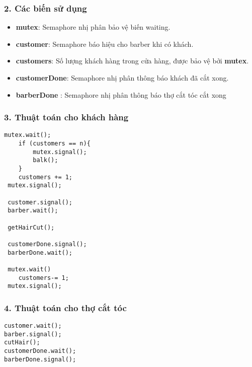 \subsubsection*{2. Các biến sử dụng}
\begin{itemize}
    \item \textbf{mutex}: Semaphore nhị phân bảo vệ biến waiting.
    \item \textbf{customer}: Semaphore báo hiệu cho barber khi có khách.
    \item \textbf{customers}: Số lượng khách hàng trong cửa hàng, được bảo vệ bởi \textbf{mutex}.
    \item \textbf{customerDone}: Semaphore nhị phân thông báo khách đã cắt xong.
    \item  \textbf{barberDone} : Semaphore nhị phân thông báo thợ cắt tóc cắt xong
\end{itemize}
\subsubsection*{3. Thuật toán cho khách hàng}
\begin{lstlisting}
mutex.wait();
    if (customers == n){
        mutex.signal();
        balk();
    }
    customers += 1;
 mutex.signal();
 
 customer.signal();
 barber.wait();
 
 getHairCut();
 
 customerDone.signal();
 barberDone.wait();
 
 mutex.wait()
    customers-= 1;
 mutex.signal();
\end{lstlisting}
\subsubsection*{4. Thuật toán cho thợ cắt tóc}
\begin{lstlisting}
customer.wait();
barber.signal();
cutHair();
customerDone.wait();
barberDone.signal();
\end{lstlisting}
